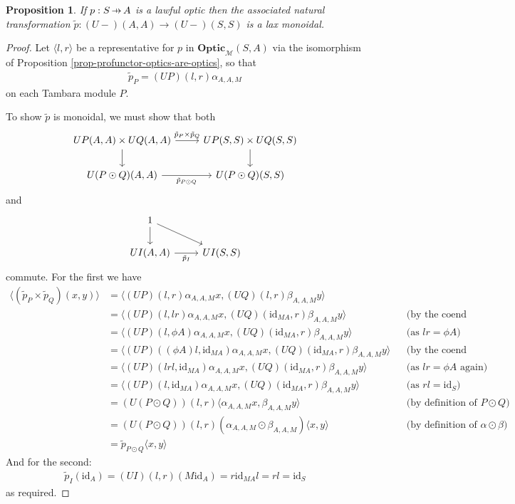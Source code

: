 \documentclass[11pt,a4paper]{article}
\theoremstyle{plain}
\newtheorem{proposition}[theorem]{Proposition}
\theoremstyle{definition}
\newcommand{\M}{\mathscr{M}}
\newcommand{\Optic}{\mathbf{Optic}}
\newcommand{\id}{\mathrm{id}}
\newcommand{\hto}{\ensuremath{\,\mathaccent\shortmid\rightarrow\,}}
\begin{document}
\begin{proposition}
If $p : S \hto A$ is a lawful optic then the associated natural transformation $\tilde{p} : (U-)(A,A) \to (U-)(S,S)$ is a lax monoidal.
\end{proposition}
\begin{proof}
Let $\langle l, r \rangle$ be a representative for $p$ in $\Optic_\M(S,A)$ via the isomorphism of Proposition \ref{prop-profunctor-optics-are-optics}, so that
\begin{align*}
\tilde{p}_P = (UP)(l,r) \alpha_{A,A,M}
\end{align*}
on each Tambara module $P$.

To show $\tilde{p}$ is monoidal, we must show that both
\[
\begin{tikzcd}
UP(A,A) \times UQ(A,A) \ar[r, "\tilde{p}_P \times \tilde{p}_Q"] \ar[d, swap] & UP(S, S) \times UQ(S, S)  \ar[d] \\
U(P \odot Q)(A,A)  \ar[r, "\tilde{p}_{P \odot Q}", swap] & U(P \odot Q)(S,S)
\end{tikzcd}
\]
and
\[
\begin{tikzcd}
1 \ar[d] \ar[dr] & \\
UI(A,A)  \ar[r, "\tilde{p}_I", swap] & UI(S,S)
\end{tikzcd}
\]
commute. For the first we have
\begin{align*}
\langle (\tilde{p}_P \times \tilde{p}_Q)(x, y) \rangle &= \langle (UP)(l,r) \alpha_{A,A,M} x,  (UQ)(l,r) \beta_{A,A,M} y\rangle \\
&= \langle (UP)(l,lr) \alpha_{A,A,M} x, (UQ)(\id_{MA},r) \beta_{A,A,M} y\rangle && \text{(by the coend relations)} \\
&= \langle (UP)(l,\phi A) \alpha_{A,A,M} x, (UQ)(\id_{MA},r) \beta_{A,A,M} y\rangle && \text{(as $lr = \phi A$)} \\
&= \langle (UP)((\phi A)l,\id_{MA}) \alpha_{A,A,M} x, (UQ)(\id_{MA},r) \beta_{A,A,M} y\rangle && \text{(by the coend relations again)} \\
&= \langle (UP)(lrl,\id_{MA}) \alpha_{A,A,M} x, (UQ)(\id_{MA},r) \beta_{A,A,M} y\rangle && \text{(as $lr = \phi A$ again)} \\
&= \langle (UP)(l,\id_{MA}) \alpha_{A,A,M} x, (UQ)(\id_{MA},r) \beta_{A,A,M} y\rangle && \text{(as $rl = \id_S$)} \\
&= (U(P \odot Q))(l,r) \langle \alpha_{A,A,M} x, \beta_{A,A,M} y \rangle && \text{(by definition of $P \odot Q$)} \\
&= (U(P \odot Q))(l,r) (\alpha_{A,A,M} \odot \beta_{A,A,M}) \langle x, y \rangle && \text{(by definition of $\alpha \odot \beta$)} \\
&= \tilde{p}_{P \odot Q} \langle x, y \rangle
\end{align*}
And for the second:
\begin{align*}
\tilde{p}_I(\id_A) = (UI)(l,r) (M \id_A) = r \id_{MA} l = rl = \id_S
\end{align*}
as required.
\end{proof}
\end{document}
